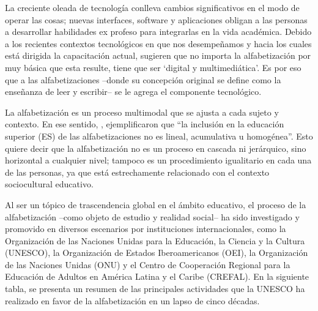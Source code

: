 \documentclass{textolivre}
\begin{document}
La creciente oleada de tecnología conlleva cambios significativos en el modo de operar las cosas; nuevas interfaces, software y aplicaciones obligan a las personas a desarrollar habilidades ex profeso para integrarlas en la vida académica. Debido a los recientes contextos tecnológicos en que nos desempeñamos y hacia los cuales está dirigida la capacitación actual, \textcite{avello__martinez_evolucion_2015} sugieren que no importa la alfabetización por muy básica que esta resulte, tiene que ser ‘digital y multimediática’. Es por eso que a las alfabetizaciones –donde su concepción original se define como la enseñanza de leer y escribir– se le agrega el componente tecnológico. 

La alfabetización es un proceso multimodal que se ajusta a cada sujeto y contexto. En ese sentido, \textcite[p. 151]{ruiz_requies_formar_2010}, ejemplificaron que “la inclusión en la educación superior (ES) de las alfabetizaciones no es lineal, acumulativa u homogénea”. Esto quiere decir que la alfabetización no es un proceso en cascada ni jerárquico, sino horizontal a cualquier nivel; tampoco es un procedimiento igualitario en cada una de las personas, ya que está estrechamente relacionado con el contexto sociocultural educativo. 

Al ser un tópico de trascendencia global en el ámbito educativo, el proceso de la alfabetización –como objeto de estudio y realidad social– ha sido investigado y promovido en diversos escenarios por instituciones internacionales, como la Organización de las Naciones Unidas para la Educación, la Ciencia y la Cultura (UNESCO), la Organización de Estados Iberoamericanos (OEI), la Organización de las Naciones Unidas (ONU) y el Centro de Cooperación Regional para la Educación de Adultos en América Latina y el Caribe (CREFAL). En la siguiente tabla, se presenta un resumen de las principales actividades que la UNESCO ha realizado en favor de la alfabetización en un lapso de cinco décadas.
\end{document}
